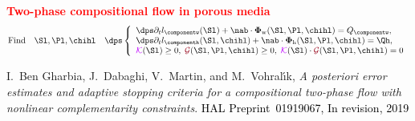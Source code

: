 \documentclass[aspectratio=169]{beamer}
\begin{document}
\begin{frame}
\textcolor{red} {\textbf{Two-phase compositional flow in porous media}}
\vspace{-0.1 cm}
\begin{equation*}
\mbox{Find} \quad \Sl, \Pl, \chihl \quad \dps
\left\lbrace\begin{array}{llccc}
\dps \partial_t l_\componentw(\Sl) + \nab \cdot {\bm \Phi}_{\mathrm{w}}(\Sl,\Pl,\chihl) = Q_{\componentw},  \\
              \dps \partial_t l_\componenth(\Sl,\chihl)  + \nab \cdot {\bm \Phi}_{\mathrm{h}}(\Sl,\Pl,\chihl)=\Qh,\\
\textcolor{electricpurple}{\mathcal{K}}(\Sl) \geq 0, \;  \textcolor{carmine}{\mathcal{G}}(\Sl,\Pl,\chihl) \geq 0, \; \textcolor{electricpurple}{\mathcal{K}}(\Sl) \cdot \textcolor{carmine}{\mathcal{G}}(\Sl,\Pl,\chihl)=0  
\end{array}
\right.
\end{equation*}
\vspace{-0.3 cm}
\begin{figure}
\end{figure}
\vspace{-0.2 cm}
\begin{thebibliography}{10}
 \scriptsize{
 {\sc I.~Ben Gharbia, J.~Dabaghi, V.~Martin, and M.~Vohral{\'{\i}}k}, {\em A posteriori error estimates and adaptive stopping criteria for a compositional two-phase flow with nonlinear complementarity constraints}.
 \textcolor{black}{HAL Preprint~01919067, In revision, 2019}}
 \end{thebibliography}
\end{frame}
\end{document}
